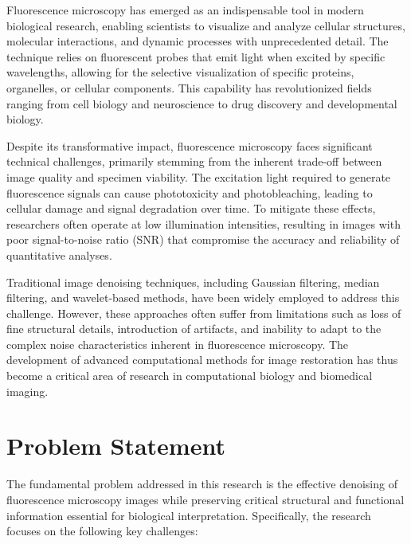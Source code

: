 \documentclass[12pt,a4paper]{report}
\begin{document}
Fluorescence microscopy has emerged as an indispensable tool in modern biological research, enabling scientists to visualize and analyze cellular structures, molecular interactions, and dynamic processes with unprecedented detail. The technique relies on fluorescent probes that emit light when excited by specific wavelengths, allowing for the selective visualization of specific proteins, organelles, or cellular components. This capability has revolutionized fields ranging from cell biology and neuroscience to drug discovery and developmental biology.

\vspace{0.5cm}

Despite its transformative impact, fluorescence microscopy faces significant technical challenges, primarily stemming from the inherent trade-off between image quality and specimen viability. The excitation light required to generate fluorescence signals can cause phototoxicity and photobleaching, leading to cellular damage and signal degradation over time. To mitigate these effects, researchers often operate at low illumination intensities, resulting in images with poor signal-to-noise ratio (SNR) that compromise the accuracy and reliability of quantitative analyses.

\vspace{0.5cm}

Traditional image denoising techniques, including Gaussian filtering, median filtering, and wavelet-based methods, have been widely employed to address this challenge. However, these approaches often suffer from limitations such as loss of fine structural details, introduction of artifacts, and inability to adapt to the complex noise characteristics inherent in fluorescence microscopy. The development of advanced computational methods for image restoration has thus become a critical area of research in computational biology and biomedical imaging.

\section{Problem Statement}

The fundamental problem addressed in this research is the effective denoising of fluorescence microscopy images while preserving critical structural and functional information essential for biological interpretation. Specifically, the research focuses on the following key challenges:

\vspace{0.5cm}
\end{document}

